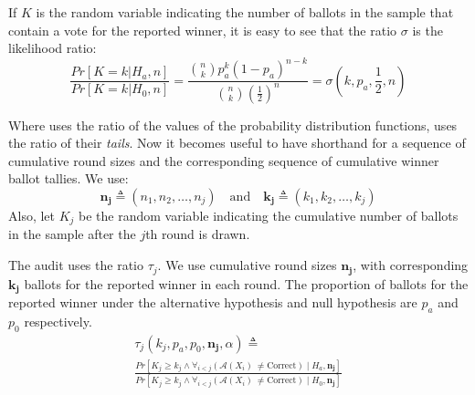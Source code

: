 If $K$ is the random variable indicating the number of ballots in the sample that contain a vote for the reported winner, it is easy to see that the ratio $\sigma$ is the likelihood ratio:
$$
\frac{Pr[K=k|H_a,n]}{Pr[K=k|H_0,n]}= \frac{\binom{n}{k}p_a^{k} (1-p_a)^{n-k}}{\binom{n}{k}(\frac{1}{2})^n} =\sigma(k, p_a, \frac{1}{2}, n)
$$

\begin{comment}
\begin{definition}[$(\alpha,p)$-\BRAVO ]\label{def:bravo}  An audit $\mathcal{A}$ is the \B~$(\alpha, p)$-\BRAVO audit iff the following stopping condition is tested at each ballot draw. If the sample $X$ is of size $n$ and has $k$ ballots for the winner,  
\begin{equation}
    \mathcal{A}(X) =  \left\{ \begin{array}{ll} \text{Correct} & ~\sigma(k, p, \frac{1}{2}, n) 
        \geq \frac{1}{\alpha}\\
        Undetermined & ~else 
    \end{array}
    \right .
    \label{eqn:bravo}
\end{equation}
\end{definition}
\end{comment}

Where \BRAVO uses the ratio of the values of the probability distribution functions, \Minerva uses the ratio of their \emph{tails}. Now it becomes useful to have shorthand for a sequence of cumulative round sizes and the corresponding sequence
of cumulative winner ballot tallies.
We use:
$$\bm{n_j}\triangleq(n_1,n_2,\ldots,n_j) \quad\text{and}\quad \bm{k_j}\triangleq(k_1,k_2,\ldots,k_j)$$
Also, let $K_j$ be the random variable indicating the cumulative number of ballots in the sample after the $j$th round is drawn.

\begin{definition} \label{def:minerva_ratio} The \R \Minerva audit uses the ratio $\tau_j$. We use cumulative round sizes $\bm{n_j}$, with corresponding $\bm{k_j}$ ballots for the reported winner in each round. The proportion of ballots for the reported winner under the alternative hypothesis and null hypothesis are $p_a$ and $p_0$ respectively.
         \begin{equation}
         \begin{aligned}
             \label{eqn:tau}
                 \tau_{j}(k_{j}, p_a,p_0, \bm{n_j}, \alpha )  \triangleq\\
                 \frac{Pr[K_{j} \geq k_{j} \wedge \forall_{i < j} ({\mathcal{A}}(X_i) ~\neq \text{Correct}) \mid H_a, \bm{n_j}]}{Pr[K_{j} \geq k_{j} \wedge \forall_{i < j} ({\mathcal{A}}(X_i) ~\neq \text{Correct}) \mid H_0, \bm{n_j}]}
         \end{aligned}
         \end{equation}
\end{definition}



